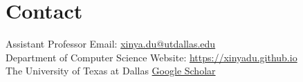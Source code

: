 \section{Contact}
\noindent Assistant Professor \hfill Email: \href{mailto:xinya.du@utdallas.edu}{{xinya.du@utdallas.edu}} \\
Department of Computer Science \hfill Website: \href{https://xinyadu.github.io}{https://xinyadu.github.io} \\
The University of Texas at Dallas \hfill \href{https://scholar.google.com/citations?user=R-lKQqkAAAAJ&hl=en}{Google Scholar} 
